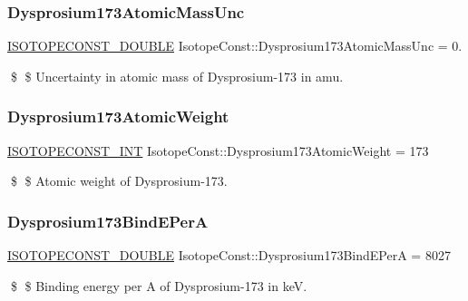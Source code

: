 \subsubsection{\texorpdfstring{Dysprosium173\+Atomic\+Mass\+Unc}{Dysprosium173AtomicMassUnc}}
{\footnotesize\ttfamily \mbox{\hyperlink{group___isotope_const-_macros_ga8f45a7272ce02c0b4c65c44636ed719a}{I\+S\+O\+T\+O\+P\+E\+C\+O\+N\+S\+T\+\_\+\+D\+O\+U\+B\+LE}} Isotope\+Const\+::\+Dysprosium173\+Atomic\+Mass\+Unc = 0.}

\$ \$ Uncertainty in atomic mass of Dysprosium-\/173 in amu. \mbox{\label{group___isotope_const-_dysprosium-_dy173_ga258c1bed9b6b1b40781d2ea8602ceaf4}} 
\subsubsection{\texorpdfstring{Dysprosium173\+Atomic\+Weight}{Dysprosium173AtomicWeight}}
{\footnotesize\ttfamily \mbox{\hyperlink{group___isotope_const-_macros_ga5f18360b3e99483a35c32d789e62621c}{I\+S\+O\+T\+O\+P\+E\+C\+O\+N\+S\+T\+\_\+\+I\+NT}} Isotope\+Const\+::\+Dysprosium173\+Atomic\+Weight = 173}

\$ \$ Atomic weight of Dysprosium-\/173. \mbox{\label{group___isotope_const-_dysprosium-_dy173_gafe2d247f83c4ff055f32ae992051769d}} 
\subsubsection{\texorpdfstring{Dysprosium173\+Bind\+E\+PerA}{Dysprosium173BindEPerA}}
{\footnotesize\ttfamily \mbox{\hyperlink{group___isotope_const-_macros_ga8f45a7272ce02c0b4c65c44636ed719a}{I\+S\+O\+T\+O\+P\+E\+C\+O\+N\+S\+T\+\_\+\+D\+O\+U\+B\+LE}} Isotope\+Const\+::\+Dysprosium173\+Bind\+E\+PerA = 8027}

\$ \$ Binding energy per A of Dysprosium-\/173 in keV. \mbox{\label{group___isotope_const-_dysprosium-_dy173_gac77c9020d9edfc6e1d10df663fca0f0e}} 
